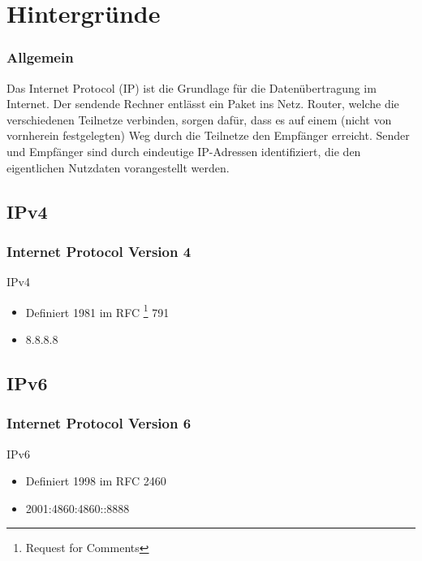 \documentclass[xcolor=dvipsnames]{beamer}
\subtitle{Modul WIN11} %
\institute{AKAD Pinneberg + Stuttgart} %
\title{\Title}
\author{\Author}
\date{\today}
\begin{document}
\begin{frame}
    \titlepage
\end{frame}


\frame{\tableofcontents} 

 
\section{Hintergründe}
\begin{frame} %
 \frametitle{Allgemein}
Das Internet Protocol (IP) ist die Grundlage für die Datenübertragung im Internet. Der sendende Rechner entlässt ein Paket ins Netz. Router, welche die verschiedenen Teilnetze verbinden, sorgen dafür, dass es auf einem (nicht von vornherein festgelegten) Weg durch die Teilnetze den Empfänger erreicht. Sender und Empfänger sind durch eindeutige IP-Adressen identifiziert, die den eigentlichen Nutzdaten vorangestellt werden.
\end{frame}


\subsection{IPv4}
\begin{frame}
 \frametitle{Internet Protocol Version 4}
  \begin{block}{IPv4}
	  \begin{itemize}
	  	\item Definiert 1981 im RFC \footnote{Request for Comments} 791
	  	\item 8.8.8.8
	  \end{itemize}
  \end{block}
\end{frame}

\subsection{IPv6}
\begin{frame}
  \frametitle{Internet Protocol Version 6}
  \begin{block}{IPv6}
	  \begin{itemize}
  		\item Definiert 1998 im RFC 2460 
  		\item 2001:4860:4860::8888
	  \end{itemize}
  \end{block}
\end{frame}
\end{document}
